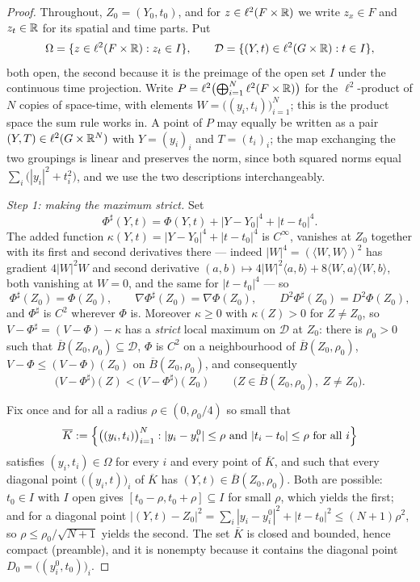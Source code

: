 \begin{proof}
Throughout, $Z_0=(Y_0,t_0)$, and for $z\in\ell^2(F\times\mathbb{R})$ we write $z_x\in F$
and $z_t\in\mathbb{R}$ for its spatial and time parts. Put
\[
  \Omega=\{z\in\ell^2(F\times\mathbb{R}):z_t\in I\},\qquad
  \mathcal D=\{(Y,t)\in\ell^2(G\times\mathbb{R}):t\in I\},
\]
both open, the second because it is the preimage of the open set $I$ under the
continuous time projection. Write
$P=\ell^2\bigl(\bigoplus_{i=1}^N\ell^2(F\times\mathbb{R})\bigr)$ for the $\ell^2$-product
of $N$ copies of space-time, with elements $W=\bigl((y_i,t_i)\bigr)_{i=1}^N$;
this is the product space the sum rule works in. A point of $P$ may equally be
written as a pair $(Y,T)\in\ell^2(G\times\mathbb{R}^N)$ with $Y=(y_i)_i$ and
$T=(t_i)_i$; the map exchanging the two groupings is linear and preserves the
norm, since both squared norms equal $\sum_i\bigl(|y_i|^2+t_i^2\bigr)$, and we
use the two descriptions interchangeably.

\emph{Step 1: making the maximum strict.}
Set
\[
  \Phi^\sharp(Y,t)=\Phi(Y,t)+|Y-Y_0|^4+|t-t_0|^4 .
\]
The added function $\kappa(Y,t)=|Y-Y_0|^4+|t-t_0|^4$ is $C^\infty$, vanishes at
$Z_0$ together with its first and second derivatives there --- indeed
$|W|^4=(\langle W,W\rangle)^2$ has gradient $4|W|^2W$ and second derivative
$(a,b)\mapsto4|W|^2\langle a,b\rangle+8\langle W,a\rangle\langle W,b\rangle$,
both vanishing at $W=0$, and the same for $|t-t_0|^4$ --- so
\begin{equation}\label{eq:cts-sharp}
  \Phi^\sharp(Z_0)=\Phi(Z_0),\qquad
  \nabla\Phi^\sharp(Z_0)=\nabla\Phi(Z_0),\qquad
  D^2\Phi^\sharp(Z_0)=D^2\Phi(Z_0),
\end{equation}
and $\Phi^\sharp$ is $C^2$ wherever $\Phi$ is. Moreover $\kappa\ge0$ with
$\kappa(Z)>0$ for $Z\ne Z_0$, so $V-\Phi^\sharp=(V-\Phi)-\kappa$ has a
\emph{strict} local maximum on $\mathcal D$ at $Z_0$: there is $\rho_0>0$ such
that $\overline B(Z_0,\rho_0)\subseteq\mathcal D$, $\Phi$ is $C^2$ on a
neighbourhood of $\overline B(Z_0,\rho_0)$, $V-\Phi\le(V-\Phi)(Z_0)$ on
$\overline B(Z_0,\rho_0)$, and consequently
\begin{equation}\label{eq:cts-strict}
  \bigl(V-\Phi^\sharp\bigr)(Z)<\bigl(V-\Phi^\sharp\bigr)(Z_0)
  \qquad\bigl(Z\in\overline B(Z_0,\rho_0),\ Z\ne Z_0\bigr).
\end{equation}

Fix once and for all a radius $\rho\in(0,\rho_0/4)$ so small that
\begin{equation}\label{eq:cts-box}
  \overline K:=\Bigl\{\bigl((y_i,t_i)\bigr)_{i=1}^N:
     |y_i-y_i^0|\le\rho\ \text{and}\ |t_i-t_0|\le\rho\ \text{for all }i\Bigr\}
\end{equation}
satisfies $(y_i,t_i)\in\Omega$ for every $i$ and every point of $\overline K$,
and such that every diagonal point $((y_i,t)\bigr)_i$ of $\overline K$ has
$(Y,t)\in\overline B(Z_0,\rho_0)$. Both are possible: $t_0\in I$ with $I$ open
gives $[t_0-\rho,t_0+\rho]\subseteq I$ for small $\rho$, which yields the first;
and for a diagonal point $|(Y,t)-Z_0|^2=\sum_i|y_i-y_i^0|^2+|t-t_0|^2
\le(N+1)\rho^2$, so $\rho\le\rho_0/\sqrt{N+1}$ yields the second. The set
$\overline K$ is closed and bounded, hence compact (preamble), and it is
nonempty because it contains the diagonal point
$D_0=\bigl((y_i^0,t_0)\bigr)_i$.


\end{proof}

